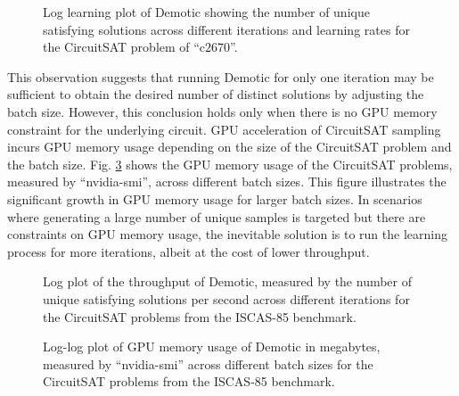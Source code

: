 \begin{figure}[t]
    \centering
    \vspace{-0.5cm}
    
    \vspace{-1cm}
    \caption{Log learning plot of {\sc Demotic} showing the number of unique satisfying solutions across different iterations and learning rates for the CircuitSAT problem of ``c$2670$''.}
    \label{fig6}
    \vspace{-0.5cm}
\end{figure}




This observation suggests that running {\sc Demotic} for only one iteration may be sufficient to obtain the desired number of distinct solutions by adjusting the batch size. However, this conclusion holds only when there is no GPU memory constraint for the underlying circuit. GPU acceleration of CircuitSAT sampling incurs GPU memory usage depending on the size of the CircuitSAT problem and the batch size. Fig. \ref{fig7} shows the GPU memory usage of the CircuitSAT problems, measured by ``nvidia-smi'', across different batch sizes. This figure illustrates the significant growth in GPU memory usage for larger batch sizes. In scenarios where generating a large number of unique samples is targeted but there are constraints on GPU memory usage, the inevitable solution is to run the learning process for more iterations, albeit at the cost of lower throughput.







\begin{figure}[t]
    \centering
    
    \vspace{-1cm}
    \caption{Log plot of the throughput of {\sc Demotic}, measured by the number of unique satisfying solutions per second across different iterations for the CircuitSAT problems from the ISCAS-85 benchmark.}
    \label{fig5}
    \vspace{-0.25cm}
\end{figure}





\begin{figure}[t]
    \centering
    \vspace{-0.5cm}
    
    \vspace{-1cm}
    \caption{Log-log plot of GPU memory usage of {\sc Demotic} in megabytes, measured by ``nvidia-smi'' across different batch sizes for the CircuitSAT problems from the ISCAS-85 benchmark.}
    \label{fig7}
    \vspace{-0.5cm}
\end{figure}


